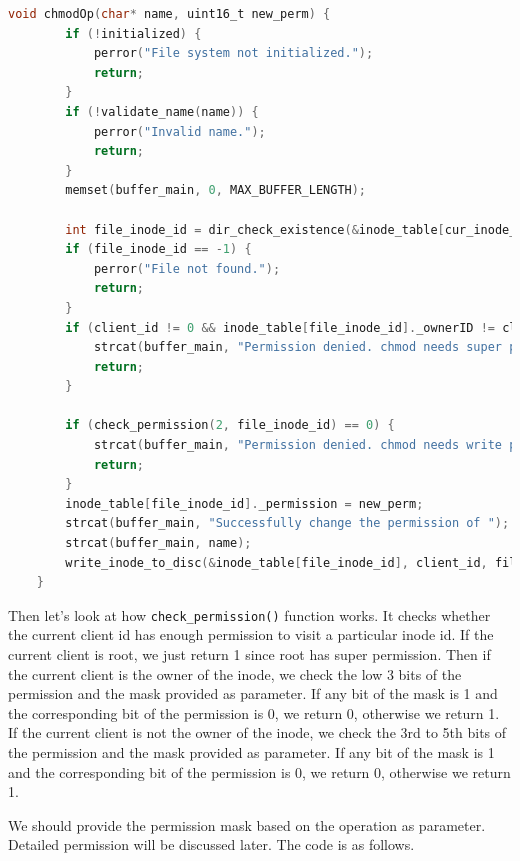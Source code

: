 \begin{lstlisting}[language=C]
    void chmodOp(char* name, uint16_t new_perm) {
        if (!initialized) {
            perror("File system not initialized.");
            return;
        }
        if (!validate_name(name)) {
            perror("Invalid name.");
            return;
        }
        memset(buffer_main, 0, MAX_BUFFER_LENGTH);
        
        int file_inode_id = dir_check_existence(&inode_table[cur_inode_id], 0, name);
        if (file_inode_id == -1) {
            perror("File not found.");
            return;
        }
        if (client_id != 0 && inode_table[file_inode_id]._ownerID != client_id) {
            strcat(buffer_main, "Permission denied. chmod needs super permission or you need to be the owner.");
            return;
        }
    
        if (check_permission(2, file_inode_id) == 0) {
            strcat(buffer_main, "Permission denied. chmod needs write permission.");
            return;
        }
        inode_table[file_inode_id]._permission = new_perm;
        strcat(buffer_main, "Successfully change the permission of ");
        strcat(buffer_main, name);
        write_inode_to_disc(&inode_table[file_inode_id], client_id, file_inode_id);
    }    
\end{lstlisting}

Then let's look at how \texttt{check\_permission()} function works. It checks whether the current client id has enough permission to visit a particular inode id.
If the current client is root, we just return 1 since root has super permission. Then if the current client is the owner of the inode, we check the low 3 bits of the permission and the mask provided as parameter. If any bit of the mask is 1 and the corresponding bit of the permission is 0, we return 0, otherwise we return 1. 
If the current client is not the owner of the inode, we check the 3rd to 5th bits of the permission and the mask provided as parameter. If any bit of the mask is 1 and the corresponding bit of the permission is 0, we return 0, otherwise we return 1. 

We should provide the permission mask based on the operation as parameter. Detailed permission will be discussed later. The code is as follows.


